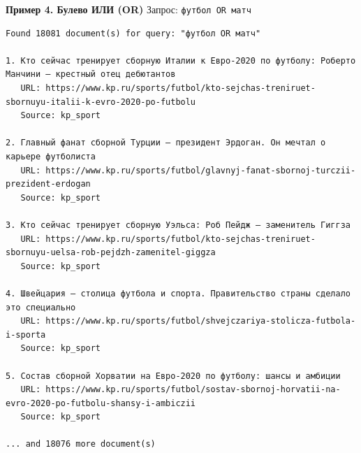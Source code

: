 \textbf{Пример 4. Булево ИЛИ (OR)}
Запрос: \texttt{футбол OR матч}
\begin{verbatim}
Found 18081 document(s) for query: "футбол OR матч"

1. Кто сейчас тренирует сборную Италии к Евро-2020 по футболу: Роберто Манчини — крестный отец дебютантов
   URL: https://www.kp.ru/sports/futbol/kto-sejchas-treniruet-sbornuyu-italii-k-evro-2020-po-futbolu
   Source: kp_sport

2. Главный фанат сборной Турции – президент Эрдоган. Он мечтал о карьере футболиста
   URL: https://www.kp.ru/sports/futbol/glavnyj-fanat-sbornoj-turczii-prezident-erdogan
   Source: kp_sport

3. Кто сейчас тренирует сборную Уэльса: Роб Пейдж — заменитель Гиггза
   URL: https://www.kp.ru/sports/futbol/kto-sejchas-treniruet-sbornuyu-uelsa-rob-pejdzh-zamenitel-giggza
   Source: kp_sport

4. Швейцария – столица футбола и спорта. Правительство страны сделало это специально
   URL: https://www.kp.ru/sports/futbol/shvejczariya-stolicza-futbola-i-sporta
   Source: kp_sport

5. Состав сборной Хорватии на Евро-2020 по футболу: шансы и амбиции
   URL: https://www.kp.ru/sports/futbol/sostav-sbornoj-horvatii-na-evro-2020-po-futbolu-shansy-i-ambiczii
   Source: kp_sport

... and 18076 more document(s)
\end{verbatim}
